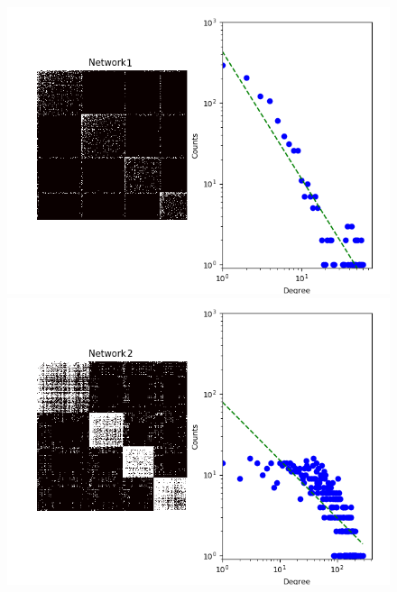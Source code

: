 
\begin{figure}[h]
        \begin{minipage}{0.24\textwidth}
            \includegraphics[width=\textwidth]{img/corpus/network1_dd}
        \end{minipage}
        \begin{minipage}{0.24\textwidth}
            \includegraphics[width=\textwidth]{img/corpus/network2_dd}
        \end{minipage}
        \begin{minipage}{0.24\textwidth}

\end{minipage}
\end{figure}
